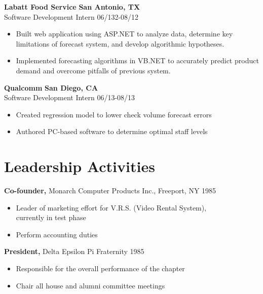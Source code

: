 \documentclass[margin]{res}
\begin{document}
\begin{resume}
 {\bf Labatt Food Service} \hfill {\bf San Antonio, TX} \\
Software Development Intern \hfill 06/132-08/12 
 \begin{itemize} \itemsep -2pt  %
 \item Built web application using ASP.NET to analyze data, determine key limitations of
	forecast system, and develop algorithmic hypotheses.
 \item Implemented forecasting algorithms in VB.NET to accurately predict product demand
	and overcome pitfalls of previous system.
 \end{itemize}

 {\bf Qualcomm} \hfill {\bf San Diego, CA} \\
Software Development Intern \hfill 06/13-08/13 
 \begin{itemize} \itemsep -2pt  %
 \item Created regression model to lower check volume 
                 forecast errors
 \item Authored PC-based software to determine optimal 
                 staff levels 
 \end{itemize}
 


\section{Leadership   Activities} 
               {\bf Co-founder,} Monarch Computer Products Inc., Freeport, NY    \hfill         1985 
                \begin{itemize} \itemsep -2pt
              \item Leader of marketing effort for V.R.S. (Video 
                 Rental System), \\
                  currently in test phase 
                 
                \item  Perform accounting duties 

		 \end{itemize}

		{\bf President,} Delta Epsilon Pi Fraternity \hfill   1985 
                \begin{itemize} \itemsep -2pt
                 \item  Responsible for the overall performance of the 
                 chapter 
                
                 \item Chair all house and alumni committee meetings 
                

\end{itemize}
\end{resume}
\end{document}
